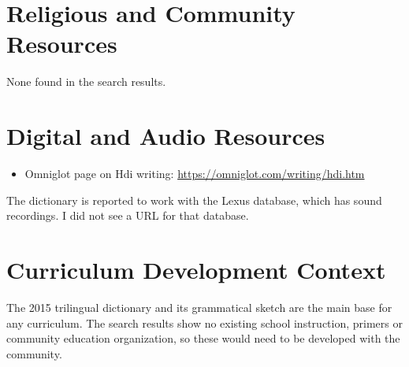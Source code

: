 \documentclass[12pt]{article}
\begin{document}
\section{Religious and Community Resources}
None found in the search results.

\section{Digital and Audio Resources}
\begin{itemize}
\item Omniglot page on Hdi writing: \url{https://omniglot.com/writing/hdi.htm}
\end{itemize}
The dictionary is reported to work with the Lexus database, which has sound recordings. I did not see a URL for that database.

\section{Curriculum Development Context}
The 2015 trilingual dictionary and its grammatical sketch are the main base for any curriculum. The search results show no existing school instruction, primers or community education organization, so these would need to be developed with the community.
\end{document}
